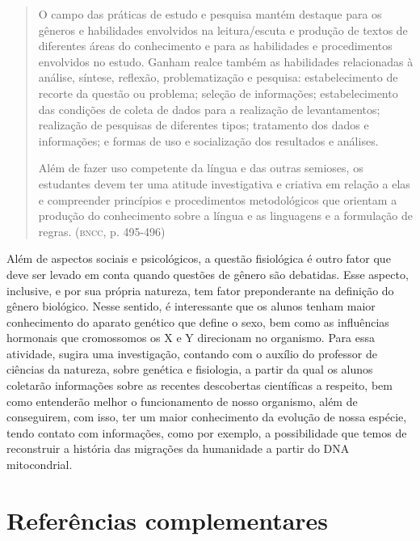 \documentclass{extarticle}
\begin{document}
\begin{quote}
O campo das práticas de estudo e pesquisa mantém destaque para os
gêneros e habilidades envolvidos na leitura/escuta e produção de textos
de diferentes áreas do conhecimento e para as habilidades e
procedimentos envolvidos no estudo. Ganham realce também as habilidades
relacionadas à análise, síntese, reflexão, problematização e pesquisa:
estabelecimento de recorte da questão ou problema; seleção de
informações; estabelecimento das condições de coleta de dados para a
realização de levantamentos; realização de pesquisas de diferentes
tipos; tratamento dos dados e informações; e formas de uso e
socialização dos resultados e análises.

Além de fazer uso competente da língua e das outras semioses, os
estudantes devem ter uma atitude investigativa e criativa em relação a
elas e compreender princípios e procedimentos metodológicos que orientam
a produção do conhecimento sobre a língua e as linguagens e a formulação
de regras. (\textsc{bncc}, p. 495-496)
\end{quote}

Além de aspectos sociais e psicológicos, a questão fisiológica é outro
fator que deve ser levado em conta quando questões de gênero são
debatidas. Esse aspecto, inclusive, e por sua própria natureza, tem
fator preponderante na definição do gênero biológico. Nesse sentido, é
interessante que os alunos tenham maior conhecimento do aparato
genético que define o sexo, bem como as influências hormonais que
cromossomos os X e Y direcionam no organismo. Para essa atividade,
sugira uma investigação, contando com o auxílio do professor de
ciências da natureza, sobre genética e fisiologia, a partir da qual os
alunos coletarão informações sobre as recentes descobertas científicas
a respeito, bem como entenderão melhor o funcionamento de nosso
organismo, além de conseguirem, com isso, ter um maior conhecimento da
evolução de nossa espécie, tendo contato com informações, como por
exemplo, a possibilidade que temos de reconstruir a história das
migrações da humanidade a partir do DNA mitocondrial.

\section{Referências complementares}
\end{document}
